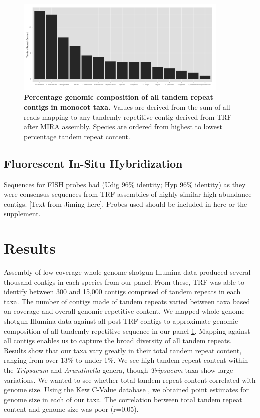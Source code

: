 \documentclass[10pt,letterpaper]{article}
\begin{document}
\begin{figure}[h]
\begin{center}
\includegraphics[width=4in]{total_trf.png}
\end{center}
\caption{{\bf Percentage genomic composition of all tandem repeat contigs in monocot taxa.}
Values are derived from the sum of all reads mapping to any tandemly repetitive contig derived from TRF after MIRA assembly.  
Species are ordered from highest to lowest percentage tandem repeat content.}
\label{totaltrf}
\end{figure}

\subsection*{Fluorescent In-Situ Hybridization}
Sequences for FISH probes had (Udig 96\% identity; Hyp 96\% identity) as they were consensus sequences from TRF assemblies of highly similar high abundance contigs.
[Text from Jiming here].
Probes used should be included in here or the supplement.


\section*{Results}
Assembly of low coverage whole genome shotgun Illumina data produced several thousand contigs in each species from our panel.
From these, TRF was able to identify between 300 and 15,000 contigs comprised of tandem repeats in each taxa.
The number of contigs made of tandem repeats varied between taxa based on coverage and overall genomic repetitive content.
We mapped whole genome shotgun Illumina data against all post-TRF contigs to approximate genomic composition of all tandemly repetitive sequence in our panel \ref{totaltrf}.
Mapping against all contigs enables us to capture the broad diversity of all tandem repeats.
Results show that our taxa vary greatly in their total tandem repeat content, ranging from over 13\% to under 1\%.
We see high tandem repeat content within the \emph{Tripsacum} and \emph{Arundinella} genera, though \emph{Tripsacum} taxa show large variations.
We wanted to see whether total tandem repeat content correlated with genome size.
Using the Kew C-Value database \cite{kewc}, we obtained point estimates for genome size in each of our taxa.
The correlation between total tandem repeat content and genome size was poor (r=0.05).
\end{document}
